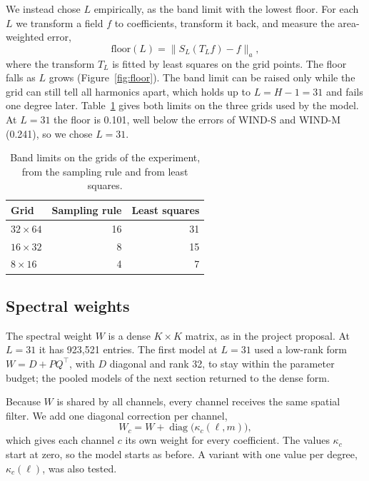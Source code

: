\documentclass{article}
\begin{document}
We instead chose $L$ empirically, as the band limit with the lowest floor. For each $L$ we transform a field $f$ to coefficients, transform it back, and measure the area-weighted error,
\begin{equation}
  \text{floor}(L)=\bigl\lVert S_L(T_L f)-f\bigr\rVert_a ,
\end{equation}
where the transform $T_L$ is fitted by least squares on the grid points. The floor falls as $L$ grows (Figure~\ref{fig:floor}). The band limit can be raised only while the grid can still tell all harmonics apart, which holds up to $L=H-1=31$ and fails one degree later. Table~\ref{tab:rank} gives both limits on the three grids used by the model. At $L=31$ the floor is 0.101, well below the errors of WIND-S and WIND-M (0.241), so we chose $L=31$.

\begin{table}[htbp]
\centering
\caption{Band limits on the grids of the experiment, from the sampling rule and from least squares.}
\label{tab:rank}
\footnotesize
\begin{tabular}{lrr}
\toprule
Grid & Sampling rule & Least squares \\
\midrule
$32\times64$ & 16 & 31 \\
$16\times32$ & 8 & 15 \\
$8\times16$ & 4 & 7 \\
\bottomrule
\end{tabular}
\end{table}

\subsection{Spectral weights}

The spectral weight $W$ is a dense $K\times K$ matrix, as in the project proposal. At $L=31$ it has 923,521 entries. The first model at $L=31$ used a low-rank form $W=D+PQ^\top$, with $D$ diagonal and rank 32, to stay within the parameter budget; the pooled models of the next section returned to the dense form.

Because $W$ is shared by all channels, every channel receives the same spatial filter. We add one diagonal correction per channel,
\begin{equation}
  W_c = W + \operatorname{diag}\big(\kappa_c(\ell,m)\big),
\end{equation}
which gives each channel $c$ its own weight for every coefficient. The values $\kappa_c$ start at zero, so the model starts as before. A variant with one value per degree, $\kappa_c(\ell)$, was also tested.
\end{document}
